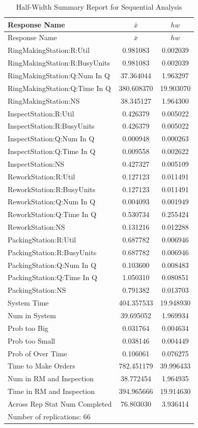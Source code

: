 \documentclass[
]{book}
\theoremstyle{definition}
\theoremstyle{definition}
\theoremstyle{definition}
\theoremstyle{definition}
\theoremstyle{remark}
\begin{document}
\begin{longtable}[]{@{}lcc@{}}
\caption{Half-Width Summary Report for Sequential Analysis}\tabularnewline
\toprule
Response Name & \(\bar{x}\) & \(hw\) \\
\midrule
\endfirsthead
\toprule
Response Name & \(\bar{x}\) & \(hw\) \\
\midrule
\endhead
RingMakingStation:R:Util & 0.981083 & 0.002039 \\
RingMakingStation:R:BusyUnits & 0.981083 & 0.002039 \\
RingMakingStation:Q:Num In Q & 37.364044 & 1.963297 \\
RingMakingStation:Q:Time In Q & 380.608370 & 19.903070 \\
RingMakingStation:NS & 38.345127 & 1.964300 \\
InspectStation:R:Util & 0.426379 & 0.005022 \\
InspectStation:R:BusyUnits & 0.426379 & 0.005022 \\
InspectStation:Q:Num In Q & 0.000948 & 0.000263 \\
InspectStation:Q:Time In Q & 0.009558 & 0.002622 \\
InspectStation:NS & 0.427327 & 0.005109 \\
ReworkStation:R:Util & 0.127123 & 0.011491 \\
ReworkStation:R:BusyUnits & 0.127123 & 0.011491 \\
ReworkStation:Q:Num In Q & 0.004093 & 0.001949 \\
ReworkStation:Q:Time In Q & 0.530734 & 0.255424 \\
ReworkStation:NS & 0.131216 & 0.012288 \\
PackingStation:R:Util & 0.687782 & 0.006946 \\
PackingStation:R:BusyUnits & 0.687782 & 0.006946 \\
PackingStation:Q:Num In Q & 0.103600 & 0.008483 \\
PackingStation:Q:Time In Q & 1.050310 & 0.080851 \\
PackingStation:NS & 0.791382 & 0.013703 \\
System Time & 404.357533 & 19.948930 \\
Num in System & 39.695052 & 1.969934 \\
Prob too Big & 0.031764 & 0.004634 \\
Prob too Small & 0.038146 & 0.004449 \\
Prob of Over Time & 0.106061 & 0.076275 \\
Time to Make Orders & 782.451179 & 39.996433 \\
Num in RM and Inspection & 38.772454 & 1.964935 \\
Time in RM and Inspection & 394.965666 & 19.914630 \\
Across Rep Stat Num Completed & 76.803030 & 3.936414 \\
Number of replications: 66 & & \\
\bottomrule
\end{longtable}
\end{document}
